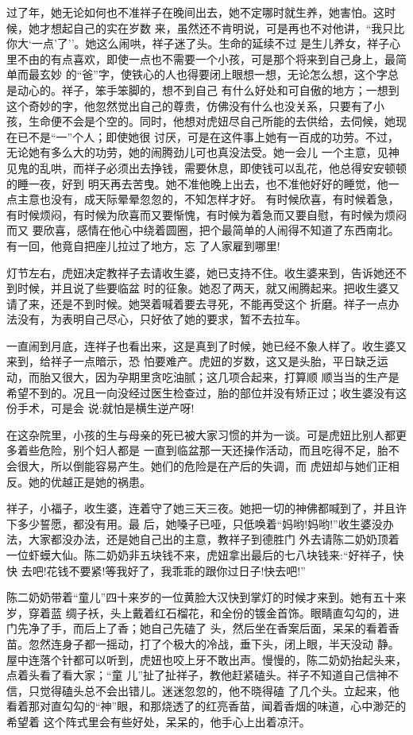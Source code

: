 \documentclass[11pt,a4paper,onecolumn]{article}
\begin{document}
过了年，她无论如何也不准祥子在晚间出去，她不定哪时就生养，她害怕。这时候，她才想起自己的实在岁数
来，虽然还不肯明说，可是再也不对他讲，``我只比你大`一点'了''。她这么闹哄，祥子迷了头。生命的延续不过
是生儿养女，祥子心里不由的有点喜欢，即使一点也不需要一个小孩，可是那个将来到自己身上，最简单而最玄妙
的``爸''字，使铁心的人也得要闭上眼想一想，无论怎么想，这个字总是动心的。祥子，笨手笨脚的，想不到自己
有什么好处和可自傲的地方；一想到这个奇妙的字，他忽然觉出自己的尊贵，仿佛没有什么也没关系，只要有了小
孩，生命便不会是个空的。同时，他想对虎妞尽自己所能的去供给，去伺候，她现在已不是``一''个人；即使她很
讨厌，可是在这件事上她有一百成的功劳。不过，无论她有多么大的功劳，她的闹腾劲儿可也真没法受。她一会儿
一个主意，见神见鬼的乱哄，而祥子必须出去挣钱，需要休息，即使钱可以乱花，他总得安安顿顿的睡一夜，好到
明天再去苦曳。她不准他晚上出去，也不准他好好的睡觉，他一点主意也没有，成天际晕晕忽忽的，不知怎样才好。
有时候欣喜，有时候着急，有时候烦闷，有时候为欣喜而又要惭愧，有时候为着急而又要自慰，有时候为烦闷而又
要欣喜，感情在他心中绕着圆圈，把个最简单的人闹得不知道了东西南北。有一回，他竟自把座儿拉过了地方，忘
了人家雇到哪里!

灯节左右，虎妞决定教祥子去请收生婆，她已支持不住。收生婆来到，告诉她还不到时候，并且说了些要临盆
时的征象。她忍了两天，就又闹腾起来。把收生婆又请了来，还是不到时候。她哭着喊着要去寻死，不能再受这个
折磨。祥子一点办法没有，为表明自己尽心，只好依了她的要求，暂不去拉车。

一直闹到月底，连祥子也看出来，这是真到了时候，她已经不象人样了。收生婆又来到，给祥子一点暗示，恐
怕要难产。虎妞的岁数，这又是头胎，平日缺乏运动，而胎又很大，因为孕期里贪吃油腻；这几项合起来，打算顺
顺当当的生产是希望不到的。况且一向没经过医生检查过，胎的部位并没有矫正过；收生婆没有这份手术，可是会
说:就怕是横生逆产呀!

在这杂院里，小孩的生与母亲的死已被大家习惯的并为一谈。可是虎妞比别人都更多着些危险，别个妇人都是
一直到临盆那一天还操作活动，而且吃得不足，胎不会很大，所以倒能容易产生。她们的危险是在产后的失调，而
虎妞却与她们正相反。她的优越正是她的祸患。

祥子，小福子，收生婆，连着守了她三天三夜。她把一切的神佛都喊到了，并且许下多少誓愿，都没有用。最
后，她嗓子已哑，只低唤着``妈哟!妈哟!''收生婆没办法，大家都没办法，还是她自己出的主意，教祥子到德胜门
外去请陈二奶奶\myrule 顶着一位虾蟆大仙。陈二奶奶非五块钱不来，虎妞拿出最后的七八块钱来:``好祥子，快快
去吧!花钱不要紧!等我好了，我乖乖的跟你过日子!快去吧!''

陈二奶奶带着``童儿''\myrule 四十来岁的一位黄脸大汉\myrule 快到掌灯的时候才来到。她有五十来岁，穿着蓝
绸子袄，头上戴着红石榴花，和全份的镀金首饰。眼睛直勾勾的，进门先净了手，而后上了香；她自己先磕了
头，然后坐在香案后面，呆呆的看着香苗。忽然连身子都一摇动，打了个极大的冷战，垂下头，闭上眼，半天没动
静。屋中连落个针都可以听到，虎妞也咬上牙不敢出声。慢慢的，陈二奶奶抬起头来，点着头看了看大家；``童
儿''扯了扯祥子，教他赶紧磕头。祥子不知道自己信神不信，只觉得磕头总不会出错儿。迷迷忽忽的，他不晓得磕
了几个头。立起来，他看着那对直勾勾的``神''眼，和那烧透了的红亮香苗，闻着香烟的味道，心中渺茫的希望着
这个阵式里会有些好处，呆呆的，他手心上出着凉汗。
\end{document}
